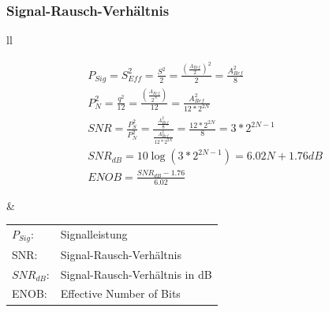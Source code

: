 \subsubsection{Signal-Rausch-Verhältnis}
\begin{tabular}{ll}

\begin{minipage}{10cm}
\begin{gather}
P_{Sig}=S^2_{Eff} =
\frac{S^2}{2}=\frac{(\frac{A_{Ref}}{2})^2}{2}=\frac{A^2_{Ref}}{8}\\
P^2_{N}=\frac{q^2}{12}=\frac{(\frac{A_{Ref}}{2^N})}{12}=\frac{A^2_{Ref}}{12*2^{2N}}\\
SNR=\frac{P^2_{S}}{P^2_{N}}=\frac{\frac{A^2_{Ref}}{8}}{\frac{A^2_{Ref}}{12*2^{2N}}}=\frac{12*2^{2N}}{8}=3*2^{2N-1}\\
SNR_{dB}=10\log(3*2^{2N-1})=6.02N+1.76dB\\
ENOB=\frac{SNR_{dB}-1.76}{6.02}
\end{gather}
\end{minipage}
&
\begin{minipage}{8cm}
\begin{tabular}{ll}
$P_{Sig}$:&Signalleistung\\
SNR:&Signal-Rausch-Verhältnis\\
$SNR_{dB}$:&Signal-Rausch-Verhältnis in dB\\
ENOB:&Effective Number of Bits\\
\end{tabular}
\end{minipage}
\end{tabular}